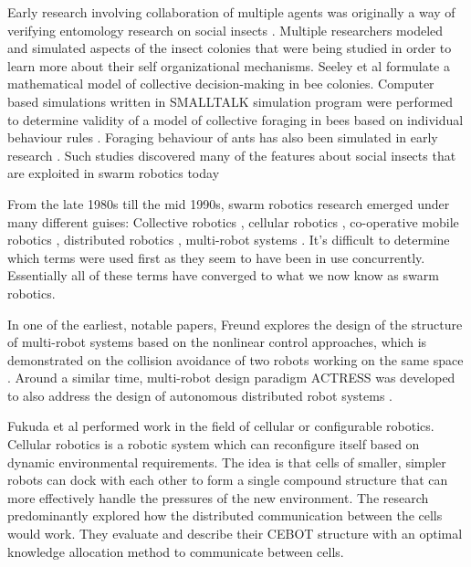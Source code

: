 Early research involving collaboration of multiple agents was originally a way of verifying entomology research on social insects \cite{dorigo2014swarm, beni1993swarm, seeley2009wisdom}. Multiple researchers modeled and simulated aspects of the insect colonies that were being studied in order to learn more about their self organizational mechanisms. Seeley et al \cite{seeley1991collective} formulate a mathematical model of collective decision-making in bee colonies. Computer based simulations written in SMALLTALK simulation program were performed to determine validity of a model of collective foraging in bees based on individual behaviour rules \cite{de1998modelling}. Foraging behaviour of ants has also been simulated in early research \cite{lopez1987optimal}. 
Such studies discovered many of the features about social insects that are exploited in swarm robotics today


From the late 1980s till the mid 1990s, swarm robotics research emerged under many different guises: Collective robotics \cite{kube1993collective}, cellular robotics \cite{freund1984design}, co-operative mobile robotics \cite{cao1997cooperative}, distributed robotics \cite{asama2013distributed}, multi-robot systems \cite{mataric1995cooperative}. It's difficult to determine which terms were used first as they seem to have been in use concurrently. Essentially all of these terms have converged to what we now know as swarm robotics.

In one of the earliest, notable papers, Freund explores the design of the structure of multi-robot systems based on the nonlinear control approaches, which is demonstrated on the collision avoidance of two robots working on the same space \cite{freund1984design,freund1986pathfinding}.
Around a similar time, multi-robot design paradigm ACTRESS was developed to also address the design of autonomous distributed robot systems \cite{asama1989desig}. 

Fukuda et al \cite{fukuda1989communication,fukuda1990analysis} performed work in the field of cellular or configurable robotics. Cellular robotics is a robotic system which can reconfigure itself based on dynamic environmental requirements. The idea is that cells of smaller, simpler robots can dock with each other to form a single compound structure that can more effectively handle the pressures of the new environment. The research predominantly explored how the distributed communication between the cells would work. They evaluate and describe their CEBOT structure with an optimal knowledge allocation method to communicate between cells. 

